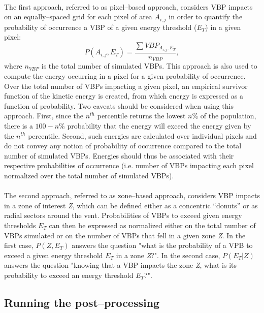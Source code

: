 \documentclass[10pt,a4paper]{article}
\begin{document}
\paragraph{} The first approach, referred to as \textsf{\color{namecolor}pixel--based} approach, considers VBP impacts on an equally--spaced grid for each pixel of area $A_{i,j}$ in order to quantify the probability of occurrence a VBP of a given energy threshold ($E_T$) in a given pixel:
\begin{equation}
P(A_{i,j}, E_T) = \frac{\sum VBP_{A_{i,j}, E_T} }{n_{VBP}},
\end{equation}
where $n_{VBP}$ is the total number of simulated VBPs. This approach is also used to compute the energy occurring in a pixel for a given probability of occurrence. Over the total number of VBPs impacting a given pixel, an empirical survivor function of the kinetic energy is created, from which energy is expressed as a function of probability. Two caveats should be considered when using this approach. First, since the $n^{th}$ percentile returns the lowest $n$\% of the population, there is a $100-n$\% probability that the energy will exceed the energy given by the $n^{th}$ percentile. Second, such energies are calculated over individual pixels and do not convey any notion of probability of occurrence compared to the total number of simulated VBPs. Energies should thus be associated with their respective probabilities of occurrence (i.e. number of VBPs impacting each pixel normalized over the total number of simulated VBPs).

\paragraph{} The second approach, referred to as \textsf{\color{namecolor}zone--based} approach, considers VBP impacts in a zone of interest \textit{Z}, which can be defined either as a concentric ``donuts'' or as radial sectors around the vent. Probabilities of VBPs to exceed given energy thresholds $E_T$ can then be expressed as normalized either on the total number of VBPs simulated or on the number of VBPs that fell in a given zone \textit{Z}. In the first case, $P(Z, E_T)$ answers the question "what is the probability of a VPB to exceed a given energy threshold $E_T$ in a zone \textit{Z}?". In the second case, $P(E_T\vert Z)$ answers the question "knowing that a VBP impacts the zone \textit{Z}, what is its probability to exceed an energy threshold $E_T$?".

\subsection{Running the post--processing}
\end{document}
